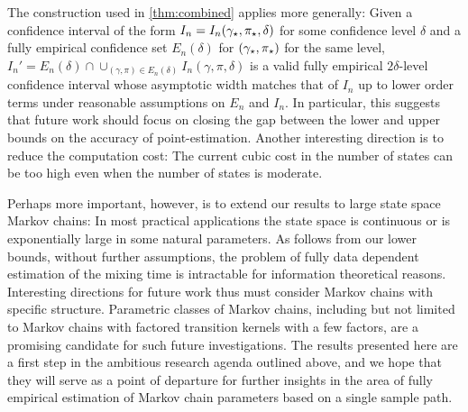 The construction used in \cref{thm:combined} applies more generally:
Given a confidence interval of the form $I_n = I_n(\gamma_{\star},\pi_{\star},\delta)$ 
for some confidence level $\delta$
and a fully empirical confidence set $E_n(\delta)$ for $(\gamma_{\star},\pi_{\star})$  for the same level,
$I_n' = E_n(\delta) \cap \cup_{(\gamma,\pi)\in E_n(\delta)} I_n(\gamma,\pi,\delta)$ is a valid
fully empirical $2\delta$-level confidence interval whose asymptotic width
matches that of $I_n$ up to lower order terms under reasonable assumptions on $E_n$ and $I_n$.
In particular, this suggests that future work should focus on 
closing the gap between the lower and upper bounds on the accuracy
of point-estimation. Another interesting direction is to 
reduce the computation cost: The current cubic cost in the number of states
can be too high even when the number of states is moderate.

Perhaps more important, however, is to extend 
our results to large state space Markov chains:
In most practical applications the state space is continuous
or is exponentially large in some natural parameters.
As follows from our lower bounds, without further assumptions,
the problem of fully data dependent estimation of the mixing time
is intractable for information theoretical reasons.
Interesting directions for future work thus must consider Markov
chains with specific structure. Parametric classes of Markov chains,
including but not limited to Markov chains with factored transition kernels
with a few factors, are a promising candidate for such future investigations.
The results presented here are a first step in the ambitious research agenda
outlined above, and we hope that they will
serve as a point of departure
for
further insights
in the area of fully empirical estimation of Markov chain 
parameters based on a single sample path.

